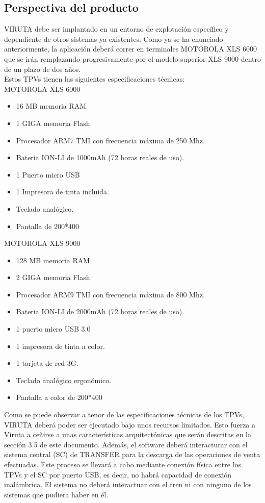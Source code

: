 \subsection{Perspectiva del producto}

VIRUTA debe ser implantado en un entorno de explotación específico y dependiente de otros sistemas ya existentes. Como ya se ha enunciado anteriormente, la aplicación deberá correr en terminales MOTOROLA XLS 6000 que se irán remplazando progresivamente por el modelo superior XLS 9000 dentro de un plazo de dos años.\\

Estos TPVs tienen las siguientes especificaciones técnicas:\\


{\Large MOTOROLA XLS 6000}
\begin{itemize}
\item 16 MB memoria RAM
\item 1 GIGA memoria Flash
\item Procesador ARM7 TMI con frecuencia máxima de 250 Mhz.
\item Bateria ION-LI de 1000mAh (72 horas reales de uso).
\item 1 Puerto micro USB
\item 1 Impresora de tinta incluida.
\item Teclado analógico.
\item Pantalla de 200*400
\end{itemize}

{\Large MOTOROLA XLS 9000}
\begin{itemize}
\item 128 MB memoria RAM
\item 2 GIGA memoria Flash
\item Procesador ARM9 TMI con frecuencia máxima de 800 Mhz.
\item Bateria ION-LI de 2000mAh (72 horas reales de uso).
\item 1 puerto micro USB 3.0
\item 1 impresora de tinta a color.
\item 1 tarjeta de red 3G.
\item Teclado analógico ergonómico.
\item Pantalla a color de 200*400
\end{itemize}

Como se puede observar a tenor de las especificaciones técnicas de los TPVs, VIRUTA deberá poder ser ejecutado bajo unos recursos limitados. Esto fuerza a Viruta a ceñirse a unas características arquitectónicas que serán descritas en la sección 3.5 de este documento.
Además, el software deberá interacturar con el sistema central (SC) de TRANSFER para la descarga de las operaciones de venta efectuadas. Este proceso se llevará a cabo mediante conexión física entre los TPVs y el SC por puerto USB, es decir, no habrá capacidad de conexión inalámbrica.
El sistema no deberá interactuar con el tren ni con ninguno de los sistemas que pudiera haber en él.\\

